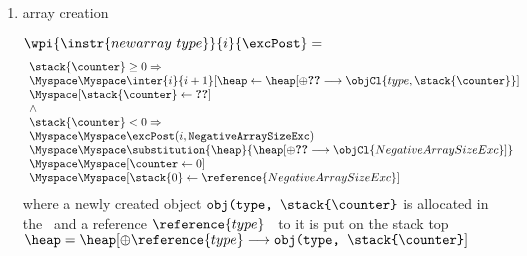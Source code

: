 \begin{itemize}
\begin{enumerate}
		
		\item array creation
		
				 $\wpi{\instr{newarray  \ type}} {i} {\excPost}  = $ \\
					$$
					\begin{array}{l}
					\stack{\counter} \ge 0 \Rightarrow  \\
						\Myspace  \Myspace \inter{i}{i+1} [ \heap  \leftarrow \heap[\oplus  \Ref{type} \longrightarrow \objCl{type,\stack{\counter} }]\\
								\Myspace	[\stack{\counter} \leftarrow \Ref{type}]  \\
							\wedge \\
						\stack{\counter} < 0 \Rightarrow  \\
							 
						\Myspace  \Myspace  \excPost( i, \tt{ NegativeArraySizeExc}) \\
                                            	\Myspace  \Myspace  \substitution{\heap}{\heap[\oplus \Ref{NegativeArraySizeExc } \longrightarrow \objCl{NegativeArraySizeExc }]}\\
						\Myspace  \Myspace  [\counter \leftarrow 0] \\
						\Myspace  \Myspace  [\stack{0} \leftarrow  \reference{ NegativeArraySizeExc}]
						\end{array} 
					$$ where a newly created object $\texttt{obj(type, \stack{\counter}}$ is allocated in the \heap \  
and a  reference $\reference{type}$  \ to it is put on the stack top $ \heap = \heap[\oplus  \reference{type} \longrightarrow \texttt{obj(type, \stack{\counter}}]$
		

\end{enumerate}
\end{itemize}
